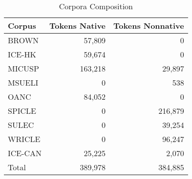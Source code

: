 \documentclass[main.tex]{subfiles}
\begin{document}
\begin{table}[htbp]
\small
\centering
\caption{Corpora Composition}
  \begin{tabular}{  l  r  r }
  \toprule
    Corpus & Tokens Native & Tokens Nonnative \\ \midrule
    BROWN & 57,809 & 0 \\
    ICE-HK & 59,674 & 0 \\
    MICUSP & 163,218  & 29,897 \\
    MSUELI & 0 & 538 \\
    OANC & 84,052 & 0 \\
    SPICLE & 0 & 216,879 \\
    SULEC & 0 & 39,254 \\
    WRICLE & 0 & 96,247  \\
    ICE-CAN & 25,225 & 2,070 \\
    \midrule
    Total & 389,978 & 384,885  \\
    \bottomrule
  \end{tabular}
\label{table:corpora}
\end{table}


\biblio
\end{document}
